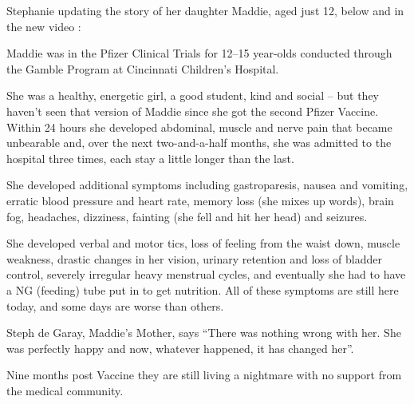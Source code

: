 Stephanie updating the story of her daughter Maddie, aged just 12, below and in
the new video :

Maddie was in the Pfizer Clinical Trials for 12–15 year-olds conducted through
the Gamble Program at Cincinnati Children’s Hospital.

She was a healthy, energetic girl, a good student, kind and social – but they
haven’t seen that version of Maddie since she got the second Pfizer Vaccine.
Within 24 hours she developed abdominal, muscle and nerve pain that became
unbearable and, over the next two-and-a-half months, she was admitted to the
hospital three times, each stay a little longer than the last.

She developed additional symptoms including gastroparesis, nausea and vomiting,
erratic blood pressure and heart rate, memory loss (she mixes up words), brain
fog, headaches, dizziness, fainting (she fell and hit her head) and seizures.

She developed verbal and motor tics, loss of feeling from the waist down, muscle
weakness, drastic changes in her vision, urinary retention and loss of bladder
control, severely irregular heavy menstrual cycles, and eventually she had to
have a NG (feeding) tube put in to get nutrition. All of these symptoms are
still here today, and some days are worse than others.

Steph de Garay, Maddie’s Mother, says “There was nothing wrong with her. She was
perfectly happy and now, whatever happened, it has changed her”.

Nine months post Vaccine they are still living a nightmare with no support from
the medical community.

